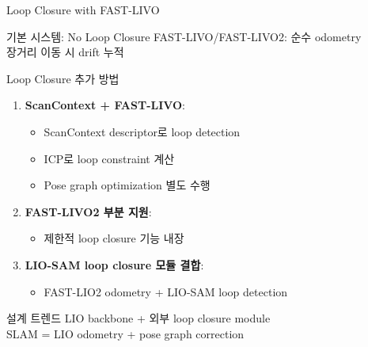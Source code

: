 \begin{frame}{Loop Closure with FAST-LIVO}
  \begin{block}{기본 시스템: No Loop Closure}
    FAST-LIVO/FAST-LIVO2: 순수 odometry\\
    장거리 이동 시 drift 누적
  \end{block}
  \pause
  \begin{block}{Loop Closure 추가 방법}
    \begin{enumerate}
      \item \textbf{ScanContext + FAST-LIVO}:
        \begin{itemize}
          \item ScanContext descriptor로 loop detection
          \item ICP로 loop constraint 계산
          \item Pose graph optimization 별도 수행
        \end{itemize}
      \item \textbf{FAST-LIVO2 부분 지원}:
        \begin{itemize}
          \item 제한적 loop closure 기능 내장
        \end{itemize}
      \item \textbf{LIO-SAM loop closure 모듈 결합}:
        \begin{itemize}
          \item FAST-LIO2 odometry + LIO-SAM loop detection
        \end{itemize}
    \end{enumerate}
  \end{block}
  \pause
  \begin{alertblock}{설계 트렌드}
    LIO backbone + 외부 loop closure module\\
    SLAM = LIO odometry + pose graph correction
  \end{alertblock}
\end{frame}


